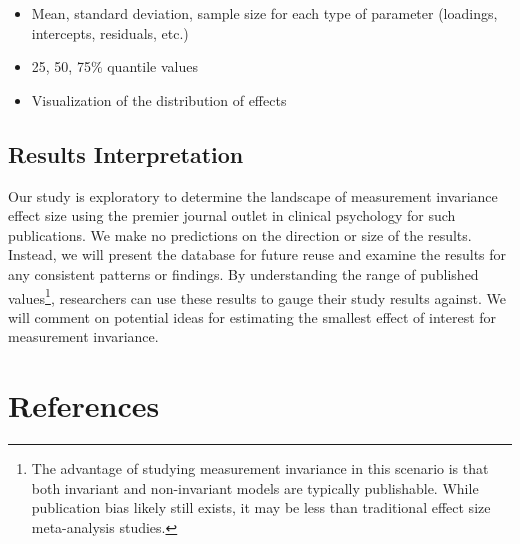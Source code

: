 \documentclass[
  man]{apa7}
\providecommand{\tightlist}{%
  \setlength{\itemsep}{0pt}\setlength{\parskip}{0pt}}
\begin{document}
\begin{itemize}
\tightlist
\item
  Mean, standard deviation, sample size for each type of parameter (loadings, intercepts, residuals, etc.)
\item
  25, 50, 75\% quantile values
\item
  Visualization of the distribution of effects
\end{itemize}

\subsection{Results Interpretation}\label{results-interpretation}

Our study is exploratory to determine the landscape of measurement invariance effect size using the premier journal outlet in clinical psychology for such publications. We make no predictions on the direction or size of the results. Instead, we will present the database for future reuse and examine the results for any consistent patterns or findings. By understanding the range of published values\footnote{The advantage of studying measurement invariance in this scenario is that both invariant and non-invariant models are typically publishable. While publication bias likely still exists, it may be less than traditional effect size meta-analysis studies.}, researchers can use these results to gauge their study results against. We will comment on potential ideas for estimating the smallest effect of interest for measurement invariance.

\newpage

\section{References}\label{references}
\end{document}
